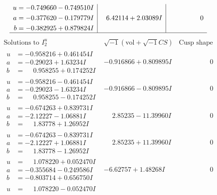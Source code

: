 \documentclass[1p]{elsarticle_modified}
\theoremstyle{definition}
\newcommand{\I}{\sqrt{-1}}
\begin{document}
$$\begin{array}{c|c|c}
\begin{aligned}
u &= -0.749660 - 0.749510 I \\
a &= -0.377620 - 0.179779 I \\
b &= -0.382925 + 0.879824 I\end{aligned}
 & \phantom{-}6.42114 + 2.03089 I & \phantom{-0.000000 } 0\\
 \hline 
 \end{array}$$\newpage$$\begin{array}{c|c|c}  
\text{Solutions to }I^u_{2}& \I (\text{vol} + \sqrt{-1}CS) & \text{Cusp shape}\\
 \hline 
\begin{aligned}
u &= -0.958216 + 0.461454 I \\
a &= -0.29023 + 1.63234 I \\
b &= \phantom{-}0.958255 + 0.174252 I\end{aligned}
 & -0.916866 + 0.809895 I & \phantom{-0.000000 } 0 \\ \hline\begin{aligned}
u &= -0.958216 - 0.461454 I \\
a &= -0.29023 - 1.63234 I \\
b &= \phantom{-}0.958255 - 0.174252 I\end{aligned}
 & -0.916866 - 0.809895 I & \phantom{-0.000000 } 0 \\ \hline\begin{aligned}
u &= -0.674263 + 0.839731 I \\
a &= -2.12227 - 1.06881 I \\
b &= \phantom{-}1.83778 + 1.26952 I\end{aligned}
 & \phantom{-}2.85235 - 11.39960 I & \phantom{-0.000000 } 0 \\ \hline\begin{aligned}
u &= -0.674263 - 0.839731 I \\
a &= -2.12227 + 1.06881 I \\
b &= \phantom{-}1.83778 - 1.26952 I\end{aligned}
 & \phantom{-}2.85235 + 11.39960 I & \phantom{-0.000000 } 0 \\ \hline\begin{aligned}
u &= \phantom{-}1.078220 + 0.052470 I \\
a &= -0.355684 - 0.249586 I \\
b &= -0.803714 + 0.656750 I\end{aligned}
 & -6.62757 + 1.48268 I & \phantom{-0.000000 } 0 \\ \hline\begin{aligned}
u &= \phantom{-}1.078220 - 0.052470 I \\

\end{aligned}
\end{array}$$
\end{document}
